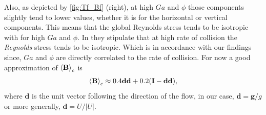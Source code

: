 Also, as depicted by \ref{fig:Tf_Bf} (right), at high $Ga$ and $\phi$ those components slightly tend to lower values, whether it is for the horizontal or vertical components. 
This means that the global Reynolds stress tends to be isotropic with for high $Ga$ and $\phi$. 
In \citet{jackson2000dynamics} they stipulate that at high rate of collision the \textit{Reynolds} stress tends to be isotropic. 
Which is in accordance with our findings since, $Ga$ and $\phi$ are directly correlated to the rate of collision. 
For now a good approximation of $\left<\textbf{B}\right>_c$ is 
\begin{equation}
    \left<\textbf{B}\right>_c 
    \approx 0.4 \textbf{dd} + 0.2 (\textbf{I} - \textbf{dd}),
    \label{eq:Bf_scaling}
\end{equation}
where $\textbf{d}$ is the unit vector following the direction of the flow, in our case, $\textbf{d} = \textbf{g}/g$ or more generally, $\textbf{d} = U/|U|$. 

